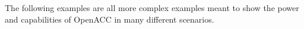 The following examples are all more complex examples meant to show the power and capabilities of OpenACC in many different scenarios. 